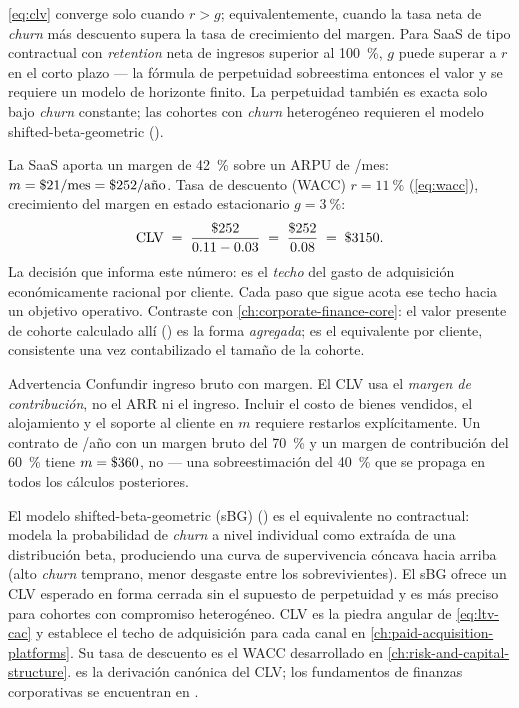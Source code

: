 \cref{eq:clv} converge solo cuando \(r > g\); equivalentemente, cuando la tasa neta de \emph{churn} más descuento supera la tasa de crecimiento del margen. Para SaaS de tipo contractual con \emph{retention} neta de ingresos superior al \qty{100}{\percent}, \(g\) puede superar a \(r\) en el corto plazo --- la fórmula de perpetuidad sobreestima entonces el valor y se requiere un modelo de horizonte finito. La perpetuidad también es exacta solo bajo \emph{churn} constante; las cohortes con \emph{churn} heterogéneo requieren el modelo shifted-beta-geometric (\textcite{fader2005rfm}).

\begin{example}
La SaaS aporta un margen de \qty{42}{\percent} sobre un ARPU de /mes: \(m = \$\num{21}/\text{mes} = \$\num{252}/\text{año}\). Tasa de descuento (WACC) \(r = \qty{11}{\percent}\) (\cref{eq:wacc}), crecimiento del margen en estado estacionario \(g = \qty{3}{\percent}\):
\[
  \mathrm{CLV} \;=\; \frac{\$\num{252}}{0.11 - 0.03} \;=\; \frac{\$\num{252}}{0.08} \;=\; \$\num{3150}.
\]
La decisión que informa este número:  es el \emph{techo} del gasto de adquisición económicamente racional por cliente. Cada paso que sigue acota ese techo hacia un objetivo operativo. Contraste con \cref{ch:corporate-finance-core}: el valor presente de cohorte calculado allí () es la forma \emph{agregada};  es el equivalente por cliente, consistente una vez contabilizado el tamaño de la cohorte.
\end{example}

\begin{admonition}{Advertencia}
Confundir ingreso bruto con margen. El CLV usa el \emph{margen de contribución}, no el ARR ni el ingreso. Incluir el costo de bienes vendidos, el alojamiento y el soporte al cliente en \(m\) requiere restarlos explícitamente. Un contrato de /año con un margen bruto del \qty{70}{\percent} y un margen de contribución del \qty{60}{\percent} tiene \(m = \$\num{360}\), no  --- una sobreestimación del \qty{40}{\percent} que se propaga en todos los cálculos posteriores.
\end{admonition}

El modelo shifted-beta-geometric (sBG) (\textcite{fader2005rfm}) es el equivalente no contractual: modela la probabilidad de \emph{churn} a nivel individual como extraída de una distribución beta, produciendo una curva de supervivencia cóncava hacia arriba (alto \emph{churn} temprano, menor desgaste entre los sobrevivientes). El sBG ofrece un CLV esperado en forma cerrada sin el supuesto de perpetuidad y es más preciso para cohortes con compromiso heterogéneo. CLV es la piedra angular de \cref{eq:ltv-cac} y establece el techo de adquisición para cada canal en \cref{ch:paid-acquisition-platforms}. Su tasa de descuento es el WACC desarrollado en \cref{ch:risk-and-capital-structure}. \textcite{gupta2004customer} es la derivación canónica del CLV; los fundamentos de finanzas corporativas se encuentran en \textcite{brealey2020}.

